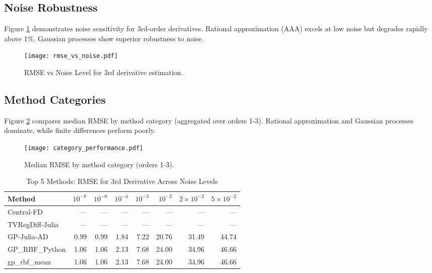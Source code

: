 \documentclass[11pt]{article}
\begin{document}
\subsection{Noise Robustness}

Figure \ref{fig:rmse_noise} demonstrates noise sensitivity for 3rd-order derivatives. Rational approximation (AAA) excels at low noise but degrades rapidly above 1\%. Gaussian processes show superior robustness to noise.

\begin{figure}[H]
\centering
\texttt{[image: rmse\_vs\_noise.pdf]}
\caption{RMSE vs Noise Level for 3rd derivative estimation.}
\label{fig:rmse_noise}
\end{figure}

\subsection{Method Categories}

Figure \ref{fig:categories} compares median RMSE by method category (aggregated over orders 1-3). Rational approximation and Gaussian processes dominate, while finite differences perform poorly.

\begin{figure}[H]
\centering
\texttt{[image: category\_performance.pdf]}
\caption{Median RMSE by method category (orders 1-3).}
\label{fig:categories}
\end{figure}

\begin{landscape}
\begin{table}[H]
\centering
\caption{Top 5 Methods: RMSE for 3rd Derivative Across Noise Levels}
\begin{tabular}{lrrrrrrr}
\toprule
Method  & $10^{-8}$ & $10^{-6}$ & $10^{-4}$ & $10^{-3}$ & $10^{-2}$ & $2 \times 10^{-2}$ & $5 \times 10^{-2}$ \\
\midrule
Central-FD & --- & --- & --- & --- & --- & --- & --- \\
TVRegDiff-Julia & --- & --- & --- & --- & --- & --- & --- \\
GP-Julia-AD & 0.99 & 0.99 & 1.84 & 7.22 & 20.76 & 31.49 & 44.74 \\
GP\_RBF\_Python & 1.06 & 1.06 & 2.13 & 7.68 & 24.00 & 34.96 & 46.66 \\
gp\_rbf\_mean & 1.06 & 1.06 & 2.13 & 7.68 & 24.00 & 34.96 & 46.66 \\
\bottomrule
\end{tabular}
\end{table}
\end{landscape}
\end{document}
